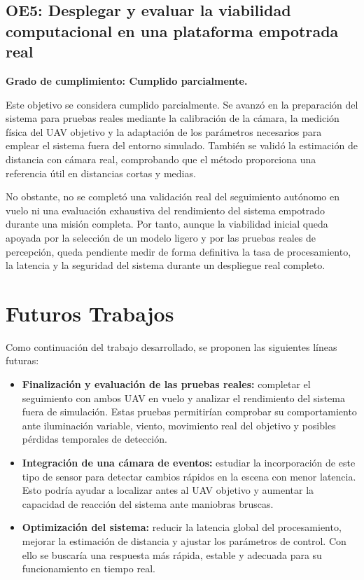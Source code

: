 \vspace{0.3cm}

\subsection*{\textbf{OE5: Desplegar y evaluar la viabilidad computacional en una plataforma empotrada real}}

\textbf{Grado de cumplimiento: Cumplido parcialmente.}

Este objetivo se considera cumplido parcialmente. Se avanzó en la preparación del sistema para pruebas reales mediante la calibración de la cámara, la medición física del UAV objetivo y la adaptación de los parámetros necesarios para emplear el sistema fuera del entorno simulado. También se validó la estimación de distancia con cámara real, comprobando que el método proporciona una referencia útil en distancias cortas y medias.

\vspace{0.2cm}

No obstante, no se completó una validación real del seguimiento autónomo en vuelo ni una evaluación exhaustiva del rendimiento del sistema empotrado durante una misión completa. Por tanto, aunque la viabilidad inicial queda apoyada por la selección de un modelo ligero y por las pruebas reales de percepción, queda pendiente medir de forma definitiva la tasa de procesamiento, la latencia y la seguridad del sistema durante un despliegue real completo.

\section{Futuros Trabajos}

Como continuación del trabajo desarrollado, se proponen las siguientes líneas futuras:

\begin{itemize}
    \item \textbf{Finalización y evaluación de las pruebas reales:} completar el seguimiento con ambos UAV en vuelo y analizar el rendimiento del sistema fuera de simulación. Estas pruebas permitirían comprobar su comportamiento ante iluminación variable, viento, movimiento real del objetivo y posibles pérdidas temporales de detección.
    \item \textbf{Integración de una cámara de eventos:} estudiar la incorporación de este tipo de sensor para detectar cambios rápidos en la escena con menor latencia. Esto podría ayudar a localizar antes al UAV objetivo y aumentar la capacidad de reacción del sistema ante maniobras bruscas.
    \item \textbf{Optimización del sistema:} reducir la latencia global del procesamiento, mejorar la estimación de distancia y ajustar los parámetros de control. Con ello se buscaría una respuesta más rápida, estable y adecuada para su funcionamiento en tiempo real.
\end{itemize}

